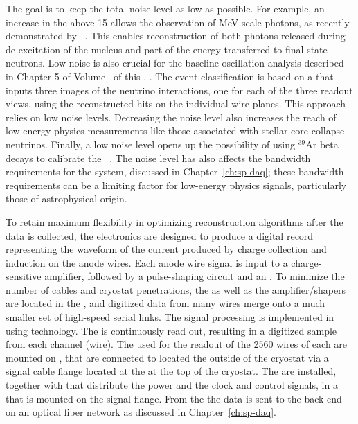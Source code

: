 The goal is to keep the total noise level as low as possible. For example, an 
increase in the  above 15 allows the observation of MeV-scale photons, 
as recently demonstrated by ~\cite{Acciarri:2018myr}. This enables  
reconstruction of both photons released during de-excitation of the nucleus and %
part
of the energy transferred to final-state neutrons. Low noise is also crucial
for the baseline oscillation analysis described in Chapter 5 of Volume~\volnumberphysics{} of this
, \voltitlephysics{}. %
The event classification is based
on %
a  that %
inputs three images
of the neutrino interactions, one for each of the three readout views, using the
reconstructed hits on the individual wire planes. This approach relies
on  low noise levels.
Decreasing the noise level also increases the reach of low-energy 
physics measurements like those associated with stellar core-collapse  neutrinos. Finally, a low noise level opens up the possibility of using 
$\mathrm{{}^{39}Ar}$ beta decays to calibrate the 
~\cite{MICROBOONE-NOTE-1050-PUB}.
The noise level has also affects %
the bandwidth requirements
for the  system, %
discussed in Chapter~\ref{ch:sp-daq}; 
these bandwidth requirements can be a limiting factor for low-energy
physics signals, particularly those of astrophysical origin.

To retain maximum flexibility in optimizing reconstruction algorithms after 
the  data is collected, the  electronics are designed 
to produce a digital record representing the waveform of the current produced 
by charge collection and induction on the anode wires.  Each anode wire signal is 
input to a charge-sensitive amplifier, followed by a pulse-shaping circuit and 
an .  To minimize the number of cables and cryostat penetrations, 
the  as well as the amplifier/shapers are located in the , 
and digitized data from many wires merge onto a much smaller set of high-speed 
serial links. The  signal processing is implemented in 
using  technology.  The  is continuously 
read out, resulting in a digitized  sample from each  
channel (wire). The  used for the readout of the \num{2560}
wires of each  are mounted on , that are connected to
 located the outside of the cryostat via a  signal 
cable flange located at the  \fdth at the top of the cryostat.
The  are installed, together with  that distribute
the power and the clock and control signals, in a  that is
mounted on the signal flange. From the  the data is sent to 
the  back-end on an optical fiber network as discussed in 
Chapter~\ref{ch:sp-daq}.

